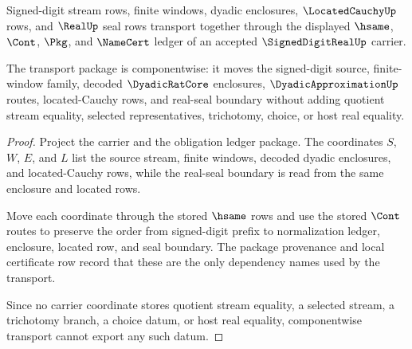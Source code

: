 \begin{theorem}
\label{thm:signed-digit-real-obligation-transport-package}
Signed-digit stream rows, finite windows, dyadic enclosures,
$\LocatedCauchyUp$ rows, and $\RealUp$ seal rows transport together through the
displayed $\hsame$, $\Cont$, $\Pkg$, and $\NameCert$ ledger of an accepted
$\SignedDigitRealUp$ carrier.

The transport package is componentwise: it moves the signed-digit source,
finite-window family, decoded $\DyadicRatCore$ enclosures,
$\DyadicApproximationUp$ routes, located-Cauchy rows, and real-seal boundary
without adding quotient stream equality, selected representatives, trichotomy,
choice, or host real equality.
\end{theorem}
\begin{proof}
Project the carrier and the obligation ledger package. The coordinates $S$,
$W$, $E$, and $L$ list the source stream, finite windows, decoded dyadic
enclosures, and located-Cauchy rows, while the real-seal boundary is read from
the same enclosure and located rows.

Move each coordinate through the stored $\hsame$ rows and use the stored
$\Cont$ routes to preserve the order from signed-digit prefix to normalization
ledger, enclosure, located row, and seal boundary. The package provenance and
local certificate row record that these are the only dependency names used by
the transport.

Since no carrier coordinate stores quotient stream equality, a selected stream,
a trichotomy branch, a choice datum, or host real equality, componentwise
transport cannot export any such datum.
\end{proof}

